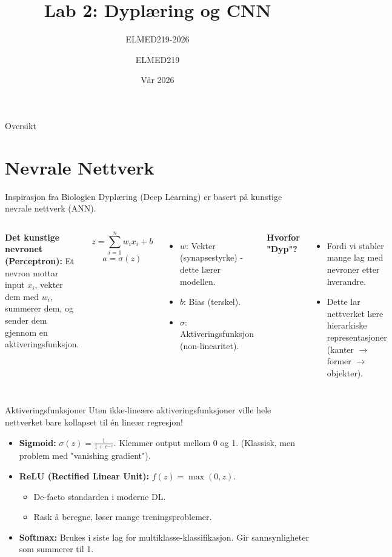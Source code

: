 \documentclass[aspectratio=169]{beamer}
\title{Lab 2: Dyplæring og CNN}
\subtitle{ELMED219-2026}
\author{ELMED219}
\date{Vår 2026}
\begin{document}
\frame{\titlepage}

\begin{frame}{Oversikt}
    \tableofcontents
\end{frame}

\section{Nevrale Nettverk}
\begin{frame}{Inspirasjon fra Biologien}
    Dyplæring (Deep Learning) er basert på kunstige nevrale nettverk (ANN).
    
    \begin{columns}
        \textbf{Det kunstige nevronet (Perceptron):}
        Et nevron mottar input $x_i$, vekter dem med $w_i$, summerer dem, og sender dem gjennom en aktiveringsfunksjon.
        
        $$ z = \sum_{i=1}^{n} w_i x_i + b $$
        $$ a = \sigma(z) $$
        
        \begin{itemize}
            \item $w$: Vekter (synapsestyrke) - dette lærer modellen.
            \item $b$: Bias (terskel).
            \item $\sigma$: Aktiveringsfunksjon (non-linearitet).
        \end{itemize}
        
        \textbf{Hvorfor "Dyp"?}
        \begin{itemize}
            \item Fordi vi stabler mange lag med nevroner etter hverandre.
            \item Dette lar nettverket lære hierarkiske representasjoner (kanter $\rightarrow$ former $\rightarrow$ objekter).
        \end{itemize}
    \end{columns}
\end{frame}

\begin{frame}{Aktiveringsfunksjoner}
    Uten ikke-lineære aktiveringsfunksjoner ville hele nettverket bare kollapset til én lineær regresjon!
    
    \begin{itemize}
        \item \textbf{Sigmoid:} $\sigma(z) = \frac{1}{1+e^{-z}}$. Klemmer output mellom 0 og 1. (Klassisk, men problem med "vanishing gradient").
        \item \textbf{ReLU (Rectified Linear Unit):} $f(z) = \max(0, z)$.
        \begin{itemize}
            \item De-facto standarden i moderne DL.
            \item Rask å beregne, løser mange treningsproblemer.
        \end{itemize}
        \item \textbf{Softmax:} Brukes i siste lag for multiklasse-klassifikasjon. Gir sannsynligheter som summerer til 1.
    \end{itemize}
\end{frame}
\end{document}
